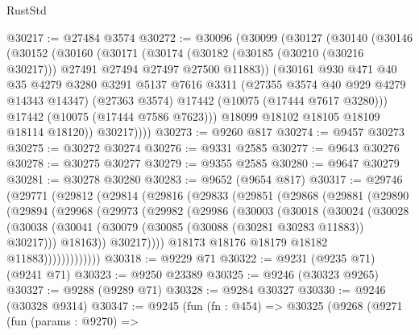\begin{lexlean}{RustStd}
\begin{coremodule}
@30217 := @27484 @3574
@30272 := @30096
    (@30099
      (@30127
        (@30140
          (@30146
            (@30152
              (@30160
                (@30171
                  (@30174
                    (@30182 (@30185 (@30210 (@30216 @30217))) @27491 @27494 @27497 @27500 @11883))
                  (@30161
                    @930
                    @471
                    @40
                    @35
                    @4279
                    @3280
                    @3291
                    @5137
                    @7616
                    @3311
                    (@27355 @3574 @40 @929 @4279 @14343 @14347)
                    (@27363 @3574)
                    @17442
                    (@10075 (@17444 @7617 @3280)))
                  @17442
                  (@10075 (@17444 @7586 @7623)))
                @18099
                @18102
                @18105
                @18109
                @18114
                @18120))
            @30217))))
@30273 := @9260 @817
@30274 := @9457 @30273
@30275 := @30272 @30274
@30276 := @9331 @2585
@30277 := @9643 @30276
@30278 := @30275 @30277
@30279 := @9355 @2585
@30280 := @9647 @30279
@30281 := @30278 @30280
@30283 := @9652 (@9654 @817)
@30317 := @29746
    (@29771
      (@29812
        (@29814
          (@29816
            (@29833
              (@29851
                (@29868
                  (@29881
                    (@29890
                      (@29894
                        (@29968
                          (@29973
                            (@29982
                              (@29986
                                (@30003
                                  (@30018
                                    (@30024
                                      (@30028
                                        (@30038
                                          (@30041
                                            (@30079
                                              (@30085 (@30088 (@30281 @30283 @11883)) @30217)))
                                          @18163))
                                      @30217))))
                              @18173
                              @18176
                              @18179
                              @18182
                              @11883)))))))))))))
@30318 := @9229 @71
@30322 := @9231 (@9235 @71) (@9241 @71)
@30323 := @9250 @23389
@30325 := @9246 (@30323 @9265)
@30327 := @9288 (@9289 @71)
@30328 := @9284 @30327
@30330 := @9246 (@30328 @9314)
@30347 := @9245
    (fun (fn : @454) =>
    @30325
      (@9268
        (@9271
          (fun (params : @9270) =>

\end{coremodule}
\end{lexlean}

